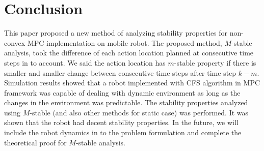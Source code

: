 \documentclass{ifacconf}
\begin{document}
\section{Conclusion}

This paper proposed a new method of analyzing stability properties for non-convex MPC implementation on mobile robot. The proposed method, $M$-stable analysis, took the difference of each action location planned at consecutive time steps in to account. We said the action location has $m$-stable property if there is smaller and smaller change between consecutive time steps after time step $k-m$. Simulation  results showed that a robot implemented with CFS algorithm in MPC framework was capable of dealing with dynamic environment as long as the changes in the environment was predictable. The stability properties analyzed using $M$-stable (and also other methods for static case) was performed. It was shown that the robot had decent stability properties. In the future, we will include the robot dynamics in to the problem formulation and complete the theoretical proof for $M$-stable analysis.



\end{document}
